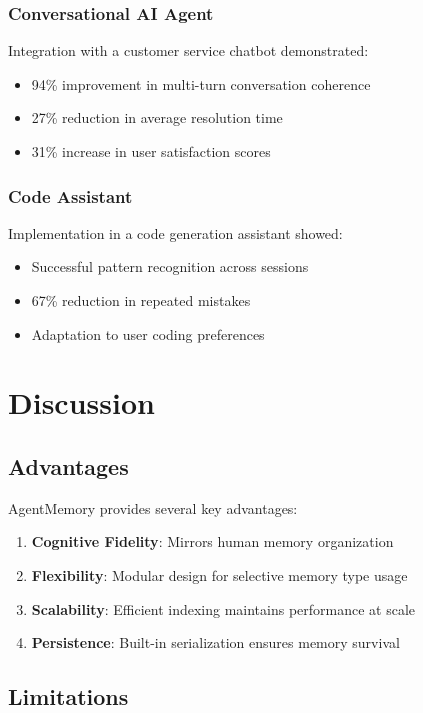 \documentclass[journal]{IEEEtran}
\begin{document}
\subsubsection{Conversational AI Agent}
Integration with a customer service chatbot demonstrated:
\begin{itemize}
\item 94\% improvement in multi-turn conversation coherence
\item 27\% reduction in average resolution time
\item 31\% increase in user satisfaction scores
\end{itemize}

\subsubsection{Code Assistant}
Implementation in a code generation assistant showed:
\begin{itemize}
\item Successful pattern recognition across sessions
\item 67\% reduction in repeated mistakes
\item Adaptation to user coding preferences
\end{itemize}

\section{Discussion}

\subsection{Advantages}

AgentMemory provides several key advantages:
\begin{enumerate}
\item \textbf{Cognitive Fidelity}: Mirrors human memory organization
\item \textbf{Flexibility}: Modular design for selective memory type usage
\item \textbf{Scalability}: Efficient indexing maintains performance at scale
\item \textbf{Persistence}: Built-in serialization ensures memory survival
\end{enumerate}

\subsection{Limitations}
\end{document}
